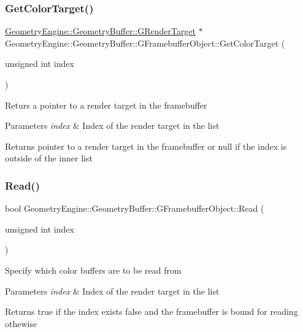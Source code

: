 \subsubsection{\texorpdfstring{GetColorTarget()}{GetColorTarget()}}
{\footnotesize\ttfamily \mbox{\hyperlink{class_geometry_engine_1_1_geometry_buffer_1_1_g_render_target}{Geometry\+Engine\+::\+Geometry\+Buffer\+::\+G\+Render\+Target}} $\ast$ Geometry\+Engine\+::\+Geometry\+Buffer\+::\+G\+Framebuffer\+Object\+::\+Get\+Color\+Target (\begin{DoxyParamCaption}\item[{unsigned int}]{index }\end{DoxyParamCaption})}

Returs a pointer to a render target in the framebuffer 
\begin{DoxyParams}{Parameters}
{\em index} & Index of the render target in the list \\
\hline
\end{DoxyParams}
\begin{DoxyReturn}{Returns}
pointer to a render target in the framebuffer or null if the index is outside of the inner list 
\end{DoxyReturn}
\mbox{\label{class_geometry_engine_1_1_geometry_buffer_1_1_g_framebuffer_object_ac805af681fd2a966b9a73e10885ec4ad}} 
\subsubsection{\texorpdfstring{Read()}{Read()}}
{\footnotesize\ttfamily bool Geometry\+Engine\+::\+Geometry\+Buffer\+::\+G\+Framebuffer\+Object\+::\+Read (\begin{DoxyParamCaption}\item[{unsigned int}]{index }\end{DoxyParamCaption})}

Specify which color buffers are to be read from 
\begin{DoxyParams}{Parameters}
{\em index} & Index of the render target in the list \\
\hline
\end{DoxyParams}
\begin{DoxyReturn}{Returns}
true if the index exists false and the framebuffer is bound for reading othewise 
\end{DoxyReturn}
\mbox{\label{class_geometry_engine_1_1_geometry_buffer_1_1_g_framebuffer_object_a52a27b64109fd6e3bfd03428454d2f05}} 
